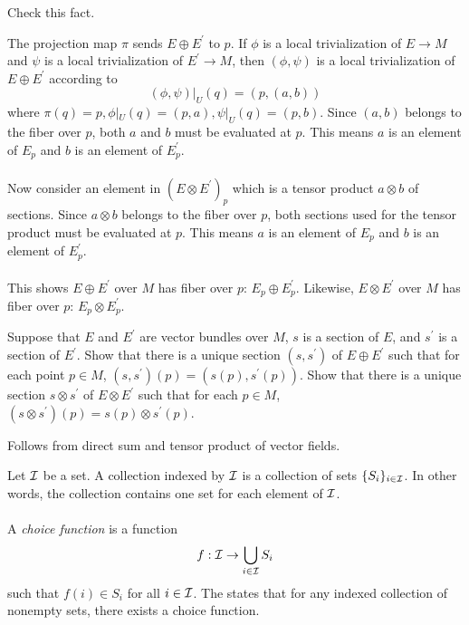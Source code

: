 \documentclass[10pt]{article}
\begin{document}
\begin{example}
	Check this fact.
\end{example}
\sol The projection map $\pi$ sends $E\oplus E^\prime$ to $p$. If $\phi$ is a local trivialization of $E\to M$ and $\psi$ is a local trivialization of $E^\prime\to M$, then $(\phi,\psi)$ is a local trivialization of $E\oplus E^\prime$ according to
$$
(\phi,\psi)|_U(q) = (p,(a,b))
$$
where $\pi(q)=p,\phi|_U(q)=(p,a),\psi|_U(q)=(p,b)$. Since $(a,b)$ belongs to the fiber over $p$, both $a$ and $b$ must be evaluated at $p$. This means $a$ is an element of $E_p$ and $b$ is an element of $E_p^\prime$.\\\\
Now consider an element in $(E\otimes E^\prime)_p$ which is a tensor product $a \otimes b$ of sections. Since $a \otimes b$ belongs to the fiber over $p$, both sections used for the tensor product must be evaluated at $p$. This means $a$ is an element of $E_p$ and $b$ is an element of $E_p^\prime$.\\\\
This shows $E\oplus E^\prime$ over $M$ has fiber over $p$: $E_p\oplus E_p^\prime$. Likewise, $E\otimes E^\prime$ over $M$ has fiber over $p$: $E_p\otimes E_p^\prime$.


\begin{example}\label{b2e71}
	Suppose that $E$ and $E^\prime$ are vector bundles over $M$, $s$ is a section of $E$, and $s^\prime$ is a section of $E^\prime$. Show that there is a unique section $(s,s^\prime)$ of $E \oplus E^\prime$ such that for each point $p \in M$, $(s,s^\prime)(p) = (s(p),s^\prime(p))$. Show that there is a unique section $s \otimes s^\prime$ of $E \otimes E^\prime$ such that for each $p \in M$, $(s \otimes s^\prime)(p) = s(p) \otimes s^\prime(p)$.
\end{example}
\sol Follows from direct sum and tensor product of vector fields.


\begin{definition}
	Let $\mathcal{I}$ be a set. A collection indexed by $\mathcal{I}$ is a collection of sets $\lbrace S_i\rbrace_{i\in \mathcal{I}}$. In other words, the collection contains one set for each element of $\mathcal{I}$.\\\\
	A \emph{choice function} is a function
	$$
	f:\mathcal{I}\to\bigcup_{i\in\mathcal{I}}S_i
	$$
	such that $f(i)\in S_i$ for all $i \in \mathcal{I}$. The  states that for any indexed collection of nonempty sets, there exists a choice function.
\end{definition}
\end{document}
